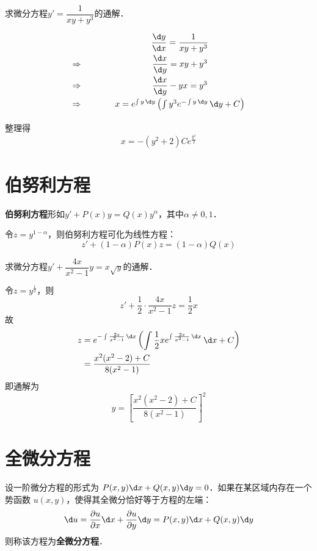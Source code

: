 \documentclass[12pt, a4paper, oneside, UTF8]{ctexbook}
\begin{document}
\begin{example}
    求微分方程$y'=\dfrac{1}{xy+y^3}$的通解．
\end{example}
\begin{solution}
    \[
    \begin{array}{l@{\qquad\qquad}c}
        &\dfrac{\d y}{\d x}=\dfrac{1}{xy+y^3}\\[8pt]
        \Rightarrow & \dfrac{\d x}{\d y}=xy+y^3\\[8pt]
        \Rightarrow & \dfrac{\d x}{\d y}-yx=y^3\\[8pt]
        \Rightarrow & x=e^{\int y\,\d y}\left(\int y^3e^{-\int y\,\d y}\,\d y+C\right)\\[8pt]
    \end{array}
    \]
    整理得
    \[\boxed{x=-(y^2+2)Ce^{\frac{y^2}{2}}}\]
\end{solution}
\section{伯努利方程}
\begin{definition}
    \textbf{伯努利方程}形如$y'+P(x)y=Q(x)y^\alpha$，其中$\alpha\neq 0,1$．
\end{definition}
\begin{theorem}
    令$z=y^{1-\alpha}$，则伯努利方程可化为线性方程：
    \[z'+(1-\alpha)P(x)z=(1-\alpha)Q(x)\]
\end{theorem}
\begin{example}
    求微分方程$y'+\dfrac{4x}{x^2-1}y=x\sqrt{y}$的通解．
\end{example}
\begin{solution}
    令$z=y^{\frac{1}{2}}$，则
    \[z'+\dfrac{1}{2}\cdot\dfrac{4x}{x^2-1}z=\dfrac{1}{2}x\]
    故\begin{align*}
    z&=e^{-\int \frac{2x}{x^2-1}\,\d x}\left(\int \dfrac{1}{2}xe^{\int \frac{2x}{x^2-1}\,\d x}\,\d x+C\right)\\
    &=\dfrac{x^2(x^2-2)+C}{8(x^2-1)}
    \end{align*}
    即通解为
    \[\boxed{y=\left[\dfrac{x^2(x^2-2)+C}{8(x^2-1)}\right]^2}\]
\end{solution}
\section{全微分方程}

\begin{definition}[全微分方程及其含义]
    设一阶微分方程的形式为 $P(x,y)\d x + Q(x,y)\d y = 0$．如果在某区域内存在一个势函数 $u(x,y)$，使得其全微分恰好等于方程的左端：
    \[ \d u = \frac{\partial u}{\partial x}\d x + \frac{\partial u}{\partial y}\d y = P(x,y)\d x + Q(x,y)\d y \]
    则称该方程为\textbf{全微分方程}．
\end{definition}
\end{document}
